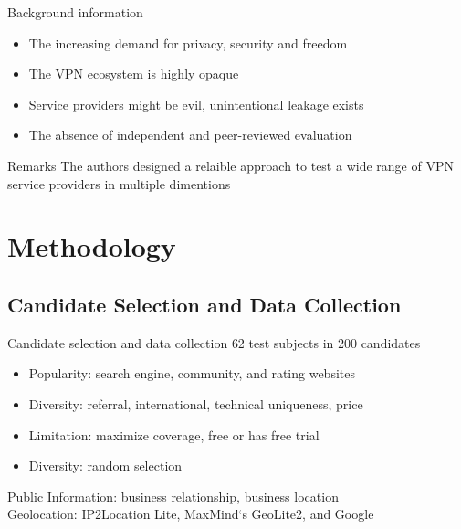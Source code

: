 \documentclass{beamer}
\begin{document}
\begin{frame}{Background information}
  \begin{itemize}
    \item The increasing demand for privacy, security and freedom
    \item The VPN ecosystem is highly opaque \pause{}
    \item Service providers might be evil, unintentional leakage exists
    \item The absence of independent and peer-reviewed evaluation \pause{}
  \end{itemize}

  \begin{block}{Remarks}
    The authors designed a relaible approach to test a wide range of VPN service providers in multiple dimentions
  \end{block}
\end{frame}

\section{Methodology}

\subsection{Candidate Selection and Data Collection}

\begin{frame}{Candidate selection and data collection}
  \colorbox{blue!40}{62} test subjects in \colorbox{DALYellow}{200} candidates
  \begin{itemize}
    \item \colorbox{DALYellow}{Popularity}: search engine, community, and rating websites
    \item \colorbox{DALYellow}{Diversity}: referral, international, technical uniqueness, price \pause{}
    \item \colorbox{blue!40}{Limitation}: maximize coverage, free or has free trial
    \item \colorbox{blue!40}{Diversity}: random selection \pause{}
  \end{itemize}
  Public Information: business relationship, business location\\
  Geolocation: IP2Location Lite, MaxMind`s GeoLite2, and Google
\end{frame}
\end{document}

